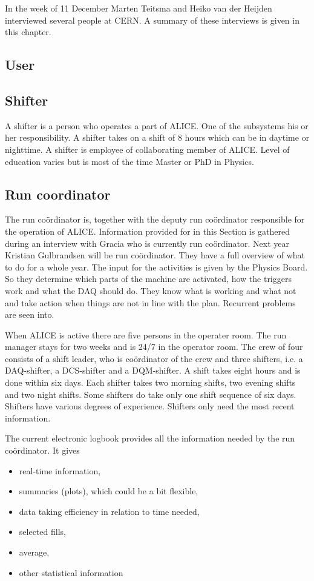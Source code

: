 In the week of 11 December Marten Teitsma and Heiko van der Heijden interviewed several people at CERN. A summary of these interviews is given in this chapter.



\subsection{User}



\subsection{Shifter}
A shifter is a person who operates a part of ALICE. One of the subsystems his or her responsibility. A shifter takes on a shift of 8 hours which can be in daytime or nighttime. A shifter is employee of collaborating member of ALICE. Level of education varies but is most of the time Master or PhD in Physics.

\subsection{Run coordinator}
The run co\"ordinator is, together with the deputy run co\"ordinator responsible for the operation of ALICE. Information provided for in this Section is gathered during an interview with Gracia who is currently run co\"ordinator. Next year Kristian Gulbrandsen will be run co\"ordinator. They have a full overview of what to do for a whole year. The input for the activities is given by the Physics Board. So they determine which parts of the machine are activated, how the triggers work and what the DAQ should do. They know what is working and what not and take action when things are not in line with the plan. Recurrent problems are seen into. 

When ALICE is active there are five persons in the operater room. The run manager stays for two weeks and is 24/7 in the operator room. The crew of four consists of a shift leader, who is co\"ordinator of the crew and three shifters, i.e. a DAQ-shifter, a DCS-shifter and a DQM-shifter. A shift takes eight hours and is done within six days. Each shifter takes two morning shifts, two evening shifts and two night shifts. Some shifters do take only one shift sequence of six days. Shifters have various degrees of experience. Shifters only need the most recent information. 

The current electronic logbook provides all the information needed by the run co\"ordinator. It gives
\begin{itemize}
  \item real-time information, 
  \item summaries (plots), which could be a bit flexible,
  \item data taking efficiency in relation to time needed,
  \item selected fills,
  \item average,
  \item other statistical information
\end{itemize}
 
